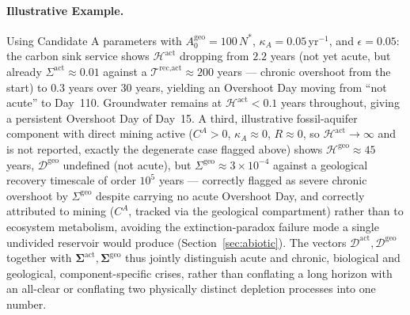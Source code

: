 \documentclass[twocolumn,10pt]{article}
\begin{document}
\paragraph{Illustrative Example.}
Using Candidate A parameters with $A^{\text{geo}}_0 = 100\,N^*$, $\kappa_A=0.05$\,yr$^{-1}$, and $\epsilon = 0.05$: the carbon sink service shows $\mathcal{H}^{\text{act}}$ dropping from $2.2$ years (not yet acute, but already $\Sigma^{\text{act}}\approx0.01$ against a $\mathcal T^{\text{rec},\text{act}}\approx200$ years — chronic overshoot from the start) to $0.3$ years over 30 years, yielding an Overshoot Day moving from ``not acute'' to Day~110. Groundwater remains at $\mathcal{H}^{\text{act}} < 0.1$ years throughout, giving a persistent Overshoot Day of Day~15. A third, illustrative fossil-aquifer component with direct mining active ($C^A>0$, $\kappa_A\approx0$, $R\approx0$, so $\mathcal H^{\text{act}}\to\infty$ and is not reported, exactly the degenerate case flagged above) shows $\mathcal H^{\text{geo}}\approx45$ years, $\mathcal D^{\text{geo}}$ undefined (not acute), but $\Sigma^{\text{geo}}\approx3\times10^{-4}$ against a geological recovery timescale of order $10^5$ years — correctly flagged as severe chronic overshoot by $\Sigma^{\text{geo}}$ despite carrying no acute Overshoot Day, and correctly attributed to mining ($C^A$, tracked via the geological compartment) rather than to ecosystem metabolism, avoiding the extinction-paradox failure mode a single undivided reservoir would produce (Section~\ref{sec:abiotic}). The vectors $\boldsymbol{\mathcal{D}}^{\text{act}},\boldsymbol{\mathcal{D}}^{\text{geo}}$ together with $\boldsymbol\Sigma^{\text{act}},\boldsymbol\Sigma^{\text{geo}}$ thus jointly distinguish acute and chronic, biological and geological, component-specific crises, rather than conflating a long horizon with an all-clear or conflating two physically distinct depletion processes into one number.
\end{document}
